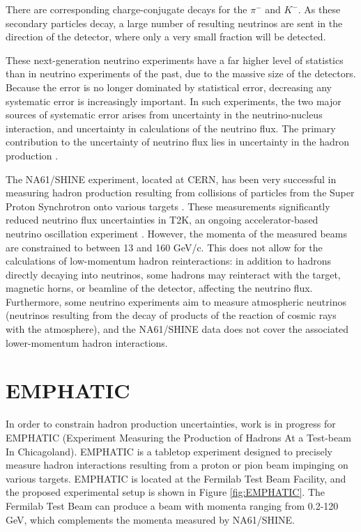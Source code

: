 There are corresponding charge-conjugate decays for the $\pi^-$ and $K^-$. 
As these secondary particles decay, a large number of resulting neutrinos are sent in the direction of the detector, where only a very small fraction will be detected.

These next-generation neutrino experiments have a far higher level of statistics than in neutrino experiments of the past, due to the massive size of the detectors.
Because the error is no longer dominated by statistical error, decreasing any systematic error is increasingly important.
In such experiments, the two major sources of systematic error arises from uncertainty in the neutrino-nucleus interaction, and uncertainty in calculations of the neutrino flux.
The primary contribution to the uncertainty of neutrino flux lies in uncertainty in the hadron production \cite{hyperKDesign}.

The NA61/SHINE experiment, located at CERN, has been very successful in measuring hadron production resulting from collisions of particles from the Super Proton Synchrotron onto various targets \cite{na61}.
These measurements significantly reduced neutrino flux uncertainties in T2K, an ongoing accelerator-based neutrino oscillation experiment \cite{na61T2K}. 
However, the momenta of the measured beams are constrained to between 13 and 160 GeV/c.
This does not allow for the calculations of low-momentum hadron reinteractions: in addition to hadrons directly decaying into neutrinos, some hadrons may reinteract with the target, magnetic horns, or beamline of the detector, affecting the neutrino flux.
Furthermore, some neutrino experiments aim to measure atmospheric neutrinos (neutrinos resulting from the decay of products of the reaction of cosmic rays with the atmosphere), and the NA61/SHINE data does not cover the associated lower-momentum hadron interactions.

 \section{\ac{EMPHATIC}}

In order to constrain hadron production uncertainties, work is in progress for EMPHATIC (Experiment Measuring the Production of Hadrons At a Test-beam In Chicagoland).
EMPHATIC is a tabletop experiment designed to precisely measure hadron interactions resulting from a proton or pion beam impinging on various targets. 
EMPHATIC is located at the Fermilab Test Beam Facility, and the proposed experimental setup is shown in Figure \ref{fig:EMPHATIC}.
The Fermilab Test Beam can produce a beam with momenta ranging from 0.2-120 GeV, which complements the momenta measured by NA61/SHINE.

